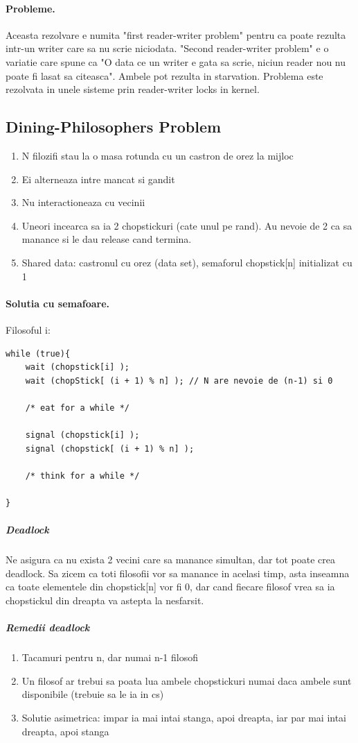 \documentclass{article}
\begin{document}
\paragraph*{Probleme.} Aceasta rezolvare e numita "first reader-writer problem" pentru ca poate rezulta intr-un writer care sa nu scrie niciodata. "Second reader-writer problem" e o variatie care spune ca "O data ce un writer e gata sa scrie, niciun reader nou nu poate fi lasat sa citeasca". Ambele pot rezulta in starvation. Problema este rezolvata in unele sisteme prin reader-writer locks in kernel.

\subsection*{Dining-Philosophers Problem}
\begin{enumerate}
    \item N filozifi stau la o masa rotunda cu un castron de orez la mijloc
    \item Ei alterneaza intre mancat si gandit
    \item Nu interactioneaza cu vecinii
    \item Uneori incearca sa ia 2 chopstickuri (cate unul pe rand). Au nevoie de 2 ca sa manance si le dau release cand termina.
    \item Shared data: castronul cu orez (data set), semaforul chopstick[n] initializat cu 1
\end{enumerate}

\paragraph*{Solutia cu semafoare.} Filosoful i:
\begin{center}
    \begin{lstlisting}
while (true){ 
    wait (chopstick[i] );
    wait (chopStick[ (i + 1) % n] ); // N are nevoie de (n-1) si 0

    /* eat for a while */

    signal (chopstick[i] );
    signal (chopstick[ (i + 1) % n] );

    /* think for a while */

}
    \end{lstlisting}
\end{center}
\subparagraph*{Deadlock} Ne asigura ca nu exista 2 vecini care sa manance simultan, dar tot poate crea deadlock. Sa zicem ca toti filosofii vor sa manance in acelasi timp, asta inseamna ca toate elementele din chopstick[n] vor fi 0, dar cand fiecare filosof vrea sa ia chopstickul din dreapta va astepta la nesfarsit.
\subparagraph*{Remedii deadlock}
\begin{enumerate}
    \item Tacamuri pentru n, dar numai n-1 filosofi
    \item Un filosof ar trebui sa poata lua ambele chopstickuri numai daca ambele sunt disponibile (trebuie sa le ia in cs)
    \item Solutie asimetrica: impar ia mai intai stanga, apoi dreapta, iar par mai intai dreapta, apoi stanga
\end{enumerate}
\end{document}

